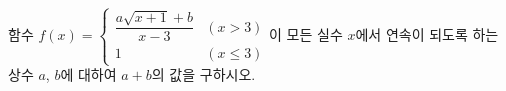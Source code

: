 함수 $f(x)=\begin{cases} \dfrac{a\sqrt{x+1}+b}{x-3} & (x>3) \\ 1 & (x\le 3) \end{cases}$이 모든 실수 $x$에서 연속이 되도록 하는 상수 $a$, $b$에 대하여 $a+b$의 값을 구하시오.

